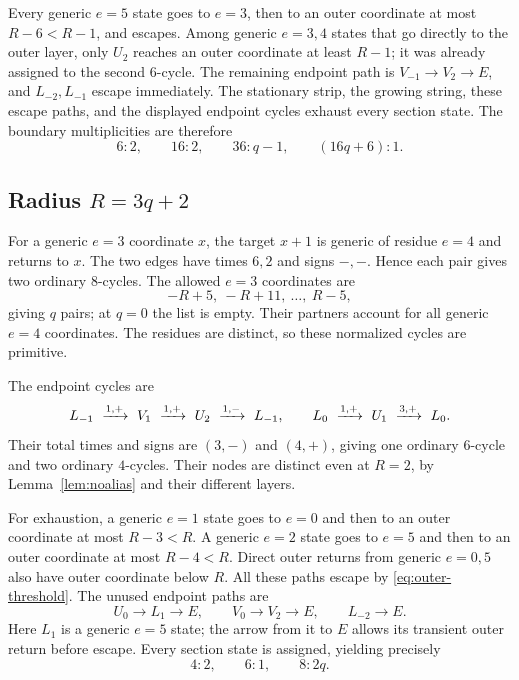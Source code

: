 Every generic $e=5$ state goes to $e=3$, then to an outer
coordinate at most $R-6<R-1$, and escapes. Among generic
$e=3,4$ states that go directly to the outer layer, only
$U_2$ reaches an outer coordinate at least $R-1$; it was
already assigned to the second $6$-cycle. The remaining endpoint
path is $V_{-1}\to V_2\to E$, and $L_{-2},L_{-1}$ escape
immediately. The stationary strip, the growing string, these
escape paths, and the displayed endpoint cycles exhaust every
section state. The boundary multiplicities are therefore
\[
 6:2,\qquad 16:2,\qquad 36:q-1,\qquad (16q+6):1.
\]

\subsection{Radius \texorpdfstring{\(R=3q+2\)}{R=3q+2}}

For a generic $e=3$ coordinate $x$, the target $x+1$ is
generic of residue $e=4$ and returns to $x$. The two edges
have times $6,2$ and signs $-,-$. Hence each pair gives
two ordinary $8$-cycles. The allowed $e=3$ coordinates are
\[
 -R+5,\ -R+11,\ \ldots,\ R-5,
\]
giving $q$ pairs; at $q=0$ the list is empty. Their partners
account for all generic $e=4$ coordinates. The residues are
distinct, so these normalized cycles are primitive.

The endpoint cycles are
\[
 L_{-1}\ \xto{1,+}\ V_1\ \xto{1,+}\ U_2\
 \xto{1,-}\ L_{-1},
 \qquad
 L_0\ \xto{1,+}\ U_1\ \xto{3,+}\ L_0.
\]
Their total times and signs are $(3,-)$ and $(4,+)$,
giving one ordinary $6$-cycle and two ordinary $4$-cycles.
Their nodes are distinct even at $R=2$, by
Lemma~\ref{lem:noalias} and their different layers.

For exhaustion, a generic $e=1$ state goes to $e=0$ and
then to an outer coordinate at most $R-3<R$. A generic
$e=2$ state goes to $e=5$ and then to an outer coordinate
at most $R-4<R$. Direct outer returns from generic $e=0,5$
also have outer coordinate below $R$. All these paths escape
by \eqref{eq:outer-threshold}. The unused endpoint paths are
\[
 U_0\longrightarrow L_1\longrightarrow E,\qquad
 V_0\longrightarrow V_2\longrightarrow E,\qquad
 L_{-2}\longrightarrow E.
\]
Here $L_1$ is a generic $e=5$ state; the arrow from it to $E$
allows its transient outer return before escape. Every section
state is assigned, yielding precisely
\[
 4:2,\qquad 6:1,\qquad 8:2q.
\]
